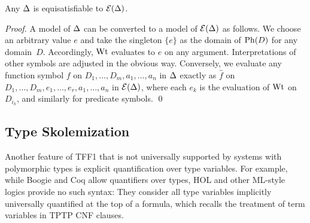 \begin{theorem} \label{thm:eli}
Any $\mathrm{\Delta}$ is equisatisfiable to $\mathcal{E}(\mathrm{\Delta})$.
\end{theorem}
\begin{proof}
A model of $\mathrm{\Delta}$ can be converted to a model of $\mathcal{E}(\mathrm{\Delta})$
as follows. We choose an arbitrary value $e$ and take the singleton
$\{ e \}$ as the domain of $\mathrm{Ph}(D)$ for any domain~$D$.
Accordingly, $\mathrm{Wt}$ evaluates to $e$ on any argument.
Interpretations of other %
symbols are adjusted in the obvious way.
%
Conversely, we evaluate any function symbol
$f$ on $D_1,\dots,D_m,a_1,\dots,a_n$ in $\mathrm{\Delta}$ exactly as
$\hat{f}$ on $D_1,\dots,D_m,\allowbreak e_1,\dots,e_r,\allowbreak a_1,\dots,a_n$
in $\mathcal{E}(\mathrm{\Delta})$,
where each $e_k$ is the evaluation of $\mathrm{Wt}$ on $D_{i_k}$, and similarly
for predicate symbols.
\qed
\end{proof}


\subsection{Type Skolemization} \label{ssec:skol}

Another feature of TFF1 that is not universally supported
by systems with polymorphic types is explicit
quantification over type variables.
For example, while Boogie \cite{leino-ruemmer-2010} and Coq \cite{bertot-casteran-2004}
allow quantifiers over types, %
HOL and other ML-style logics provide no such syntax:
They consider all type variables
implicitly universally quantified at the top of a formula, which
recalls the treatment of term variables in TPTP CNF clauses.

